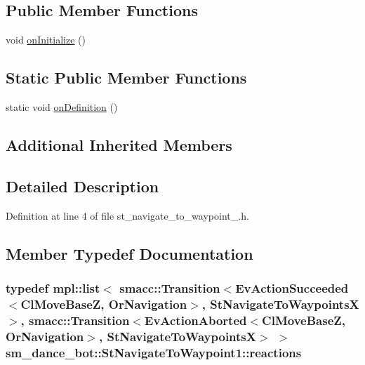 \subsection*{Public Member Functions}
\begin{DoxyCompactItemize}
\item 
void \hyperlink{structsm__dance__bot_1_1StNavigateToWaypoint1_aa38b068a364e0a02adc39a32fd37cf77}{on\+Initialize} ()
\end{DoxyCompactItemize}
\subsection*{Static Public Member Functions}
\begin{DoxyCompactItemize}
\item 
static void \hyperlink{structsm__dance__bot_1_1StNavigateToWaypoint1_a03b6c5f4cfda110765f805762f3b09c8}{on\+Definition} ()
\end{DoxyCompactItemize}
\subsection*{Additional Inherited Members}


\subsection{Detailed Description}


Definition at line 4 of file st\+\_\+navigate\+\_\+to\+\_\+waypoint\+\_.\+h.



\subsection{Member Typedef Documentation}
\subsubsection[{\texorpdfstring{reactions}{reactions}}]{\setlength{\rightskip}{0pt plus 5cm}typedef mpl\+::list$<$ {\bf smacc\+::\+Transition}$<$Ev\+Action\+Succeeded$<${\bf Cl\+Move\+BaseZ}, {\bf Or\+Navigation}$>$, {\bf St\+Navigate\+To\+WaypointsX}$>$, {\bf smacc\+::\+Transition}$<$Ev\+Action\+Aborted$<${\bf Cl\+Move\+BaseZ}, {\bf Or\+Navigation}$>$, {\bf St\+Navigate\+To\+WaypointsX}$>$ $>$ {\bf sm\+\_\+dance\+\_\+bot\+::\+St\+Navigate\+To\+Waypoint1\+::reactions}}\hypertarget{structsm__dance__bot_1_1StNavigateToWaypoint1_a21fa0c94f580ad96682e36bf72bbf32c}{}\label{structsm__dance__bot_1_1StNavigateToWaypoint1_a21fa0c94f580ad96682e36bf72bbf32c}


